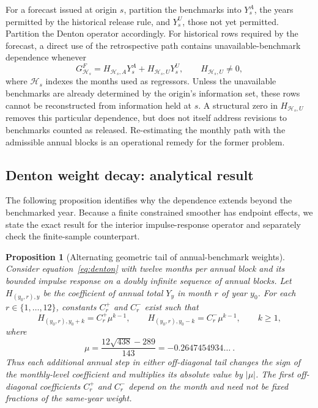 \documentclass[preprint,12pt,authoryear]{elsarticle}
\newtheorem{proposition}{Proposition}
\begin{document}
For a forecast issued at origin $s$, partition the benchmarks into $Y^A_s$, the years permitted by the historical release rule, and $Y^U_s$, those not yet permitted. Partition the Denton operator accordingly. For historical rows required by the forecast, a direct use of the retrospective path contains unavailable-benchmark dependence whenever
\begin{equation}
G^F_{\mathcal H_s}=H_{\mathcal H_s,A}Y^A_s+H_{\mathcal H_s,U}Y^U_s,
\qquad H_{\mathcal H_s,U}\ne 0,
\label{eq:information_condition}
\end{equation}
where $\mathcal H_s$ indexes the months used as regressors. Unless the unavailable benchmarks are already determined by the origin's information set, these rows cannot be reconstructed from information held at $s$. A structural zero in $H_{\mathcal H_s,U}$ removes this particular dependence, but does not itself address revisions to benchmarks counted as released. Re-estimating the monthly path with the admissible annual blocks is an operational remedy for the former problem.

\subsection{Denton weight decay: analytical result}

The following proposition identifies why the dependence extends beyond the benchmarked year. Because a finite constrained smoother has endpoint effects, we state the exact result for the interior impulse-response operator and separately check the finite-sample counterpart.

\begin{proposition}[Alternating geometric tail of annual-benchmark weights]\label{prop:denton}
Consider equation~\eqref{eq:denton} with twelve months per annual block and its bounded impulse response on a doubly infinite sequence of annual blocks. Let $H_{(y_0,r),y}$ be the coefficient of annual total $Y_y$ in month $r$ of year $y_0$. For each $r\in\{1,\ldots,12\}$, constants $C_r^+$ and $C_r^-$ exist such that
\begin{equation}
H_{(y_0,r),y_0+k}=C_r^+\mu^{k-1},\qquad
H_{(y_0,r),y_0-k}=C_r^-\mu^{k-1},\qquad k\geq1,
\label{eq:denton_tail}
\end{equation}
where
\begin{equation}
\mu=\frac{12\sqrt{438}-289}{143}=-0.2647454934\ldots\ .
\label{eq:denton_mu}
\end{equation}
Thus each additional annual step in either off-diagonal tail changes the sign of the monthly-level coefficient and multiplies its absolute value by $|\mu|$. The first off-diagonal coefficients $C_r^+$ and $C_r^-$ depend on the month and need not be fixed fractions of the same-year weight.
\end{proposition}
\end{document}
